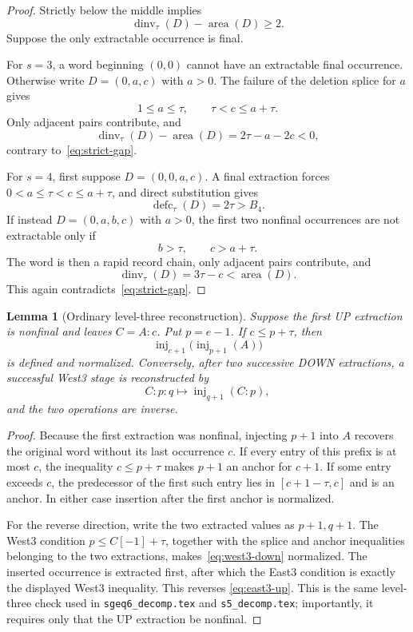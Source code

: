\documentclass[11pt]{article}
\newtheorem{lemma}[theorem]{Lemma}
\theoremstyle{definition}
\theoremstyle{remark}
\newcommand{\area}{\operatorname{area}}
\newcommand{\dinv}{\operatorname{dinv}}
\newcommand{\defc}{\operatorname{defc}}
\newcommand{\inj}{\operatorname{inj}}
\begin{document}
\begin{proof}
Strictly below the middle implies
\begin{equation}
 \dinv_\tau(D)-\area(D)\ge2.
 \label{eq:strict-gap}
\end{equation}
Suppose the only extractable occurrence is final.

For $s=3$, a word beginning $(0,0)$ cannot have an extractable final
occurrence.  Otherwise write $D=(0,a,c)$ with $a>0$.  The failure of the
deletion splice for $a$ gives
\[
 1\le a\le\tau,\qquad \tau<c\le a+\tau.
\]
Only adjacent pairs contribute, and
\[
 \dinv_\tau(D)-\area(D)=2\tau-a-2c<0,
\]
contrary to~\eqref{eq:strict-gap}.

For $s=4$, first suppose $D=(0,0,a,c)$.  A final extraction forces
$0<a\le\tau<c\le a+\tau$, and direct substitution gives
\[
 \defc_\tau(D)=2\tau>B_4.
\]
If instead $D=(0,a,b,c)$ with $a>0$, the first two nonfinal occurrences
are not extractable only if
\[
 b>\tau,\qquad c>a+\tau.
\]
The word is then a rapid record chain, only adjacent pairs contribute, and
\[
 \dinv_\tau(D)=3\tau-c<\area(D).
\]
This again contradicts~\eqref{eq:strict-gap}.
\end{proof}

\begin{lemma}[Ordinary level-three reconstruction]
\label{lem:level-three}
Suppose the first UP extraction is nonfinal and leaves $C=A:c$.  Put
$p=e-1$.  If $c\le p+\tau$, then
\begin{equation}
 \inj_{c+1}\bigl(\inj_{p+1}(A)\bigr)
 \label{eq:east3-up}
\end{equation}
is defined and normalized.  Conversely, after two successive DOWN
extractions, a successful West3 stage is reconstructed by
\begin{equation}
 C:p:q\longmapsto\inj_{q+1}(C:p),
 \label{eq:west3-down}
\end{equation}
and the two operations are inverse.
\end{lemma}

\begin{proof}
Because the first extraction was nonfinal, injecting $p+1$ into $A$
recovers the original word without its last occurrence $c$.  If every
entry of this prefix is at most $c$, the inequality $c\le p+\tau$ makes
$p+1$ an anchor for $c+1$.  If some entry exceeds $c$, the predecessor of
the first such entry lies in $[c+1-\tau,c]$ and is an anchor.  In either
case insertion after the first anchor is normalized.

For the reverse direction, write the two extracted values as $p+1,q+1$.
The West3 condition $p\le C[-1]+\tau$, together with the splice and anchor
inequalities belonging to the two extractions, makes~\eqref{eq:west3-down}
normalized.  The inserted occurrence is extracted first, after which the
East3 condition is exactly the displayed West3 inequality.  This reverses
\eqref{eq:east3-up}.  This is the same level-three check used in
\texttt{sgeq6\_decomp.tex} and \texttt{s5\_decomp.tex}; importantly, it
requires only that the UP extraction be nonfinal.
\end{proof}
\end{document}
